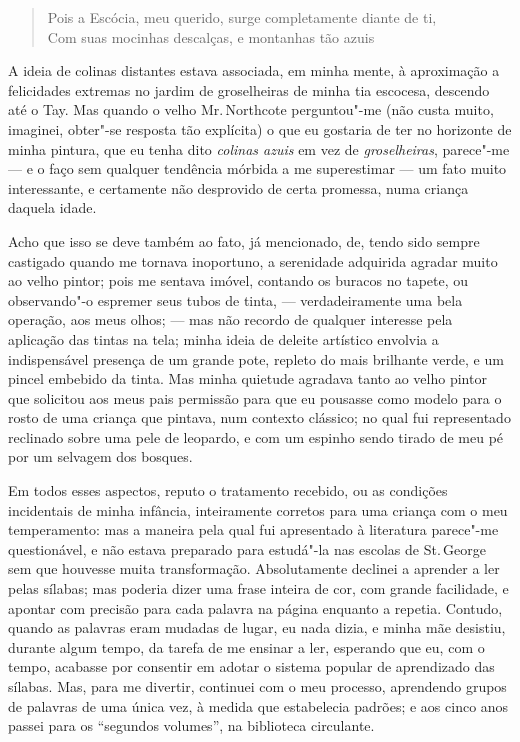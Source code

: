 \begin{verse}
Pois a Escócia, meu querido, surge completamente diante de ti,\\
Com suas mocinhas descalças, e montanhas tão azuis\footnotemark
\end{verse}


A ideia de colinas distantes estava associada, em minha mente, à
aproximação a felicidades extremas no jardim de groselheiras de minha
tia escocesa, descendo até o Tay. Mas quando o velho Mr.\,Northcote
perguntou"-me (não custa muito, imaginei, obter"-se resposta tão
explícita) o que eu gostaria de ter no horizonte de minha pintura, que
eu tenha dito \textit{colinas azuis} em vez de \textit{groselheiras}, parece"-me ---
e o faço sem qualquer tendência mórbida a me superestimar --- um fato
muito interessante, e certamente não desprovido de certa promessa, numa
criança daquela idade.

Acho que isso se deve também ao fato, já mencionado, de, tendo sido
sempre castigado quando me tornava inoportuno, a serenidade adquirida
agradar muito ao velho pintor; pois me sentava imóvel, contando os
buracos no tapete, ou observando"-o espremer seus tubos de tinta, ---
verdadeiramente uma bela operação, aos meus olhos; --- mas não recordo de
qualquer interesse pela aplicação das tintas na tela; minha ideia de
deleite artístico envolvia a indispensável presença de um grande pote,
repleto do mais brilhante verde, e um pincel embebido da tinta. Mas
minha quietude agradava tanto ao velho pintor que solicitou aos meus
pais permissão para que eu pousasse como modelo para o rosto de uma
criança que pintava, num contexto clássico; no qual fui representado
reclinado sobre uma pele de leopardo, e com um espinho sendo tirado de
meu pé por um selvagem dos bosques.

Em todos esses aspectos, reputo o tratamento recebido, ou as
condições incidentais de minha infância, inteiramente corretos para uma
criança com o meu temperamento: mas a maneira pela qual fui apresentado
à literatura parece"-me questionável, e não estava preparado para
estudá"-la nas escolas de St.\,George sem que houvesse muita transformação.
Absolutamente declinei a aprender a ler pelas sílabas; mas poderia dizer
uma frase inteira de cor, com grande facilidade, e apontar com precisão
para cada palavra na página enquanto a repetia. Contudo, quando as
palavras eram mudadas de lugar, eu nada dizia, e minha mãe desistiu,
durante algum tempo, da tarefa de me ensinar a ler, esperando que eu,
com o tempo, acabasse por consentir em adotar o sistema popular de
aprendizado das sílabas. Mas, para me divertir, continuei com o meu
processo, aprendendo grupos de palavras de uma única vez, à medida que
estabelecia padrões; e aos cinco anos passei para os ``segundos
volumes'', na biblioteca circulante.

